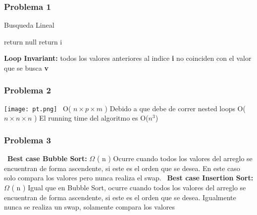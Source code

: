 \documentclass{beamer}
\begin{document}
\begin{frame}

    \frametitle{Problema 1}

    \begin{algorithm}[H]
        \caption{Busqueda Lineal}
        \begin{algorithmic}[1]
        
        \State return null
        \State return i
        \EndIf
        

        \EndFor
        \EndProcedure
        \end{algorithmic}
    \end{algorithm}
     \textbf{Loop Invariant:} todos los valores anteriores al indice \textbf{i} no coinciden con el valor que se busca \textbf{v}
    
\end{frame}

\begin{frame}

\frametitle{Problema 2}
\texttt{[image: pt.png]}
\newline
\ O( $n \times p \times m$ ) 
\newline Debido a que debe de correr nested loops  O( $n \times n \times n$ ) 
\newline El running time del algoritmo es O({$n^3$})
\end{frame}

\begin{frame}
\frametitle{Problema 3}
\ \textbf{Best case Bubble Sort:} {$\Omega$} ( n ) 
\newline  Ocurre cuando todos los valores del arreglo se encuentran de forma ascendente, si este es el orden que se desea. En este caso solo compara los valores pero nunca realiza el swap.
\newline 
\newline 
\ \textbf{Best case Insertion Sort:} {$\Omega$} ( n )  
\newline  Igual que en Bubble Sort, ocurre cuando todos los valores del arreglo se encuentran de forma ascendente, si este es el orden que se desea. Igualmente nunca se realiza un swap, solamente compara los valores

\end{frame}
\end{document}
